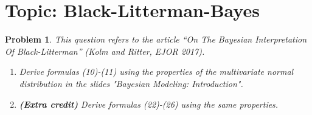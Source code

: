 \documentclass[11pt]{article}
\theoremstyle{plain} %
\newtheorem{problem}[theorem]{Problem}
\theoremstyle{remark}
\begin{document}
\section{Topic: Black-Litterman-Bayes}
\begin{problem}
This question refers to the article ``On The Bayesian Interpretation Of
Black-Litterman'' (Kolm and Ritter, EJOR 2017).
\begin{enumerate}[label=(\alph*)]
  \item Derive formulas (10)-(11) using the properties of the multivariate
        normal distribution in the slides "Bayesian Modeling: Introduction".
  \item \textbf{(Extra credit)} Derive formulas (22)-(26) using the same
        properties.
\end{enumerate}
\end{problem}
\end{document}
